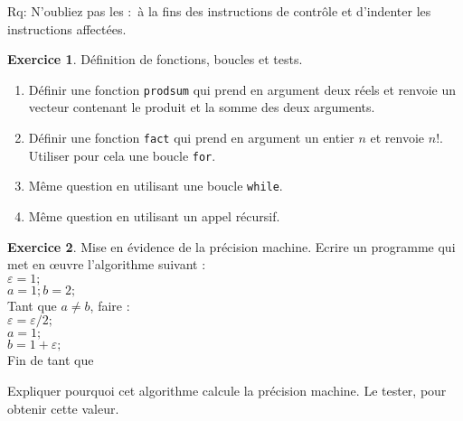 \documentclass[a4paper,francais,11pt]{article}
\theoremstyle{definition}
\newtheorem{exercice}{Exercice}
\begin{document}
Rq: N'oubliez pas les $:$ à la fins des instructions de contrôle et d'indenter les instructions affectées.
\begin{exercice}
  Définition de fonctions, boucles et tests. 
  \begin{enumerate}
  \item Définir une fonction {\tt prodsum} qui prend en argument deux
    réels et renvoie un vecteur contenant le produit et la somme des
    deux arguments.
  \item Définir une fonction {\tt fact} qui prend en
    argument un entier $n$ et renvoie $n!$. Utiliser pour cela une boucle
    {\tt for}.
  \item M\^eme question en utilisant une boucle {\tt while}.
  \item M\^eme question en utilisant un appel récursif.
  \end{enumerate}
\end{exercice}

\begin{exercice}
  Mise en évidence de la précision machine. Ecrire un programme qui met
  en \oe uvre l'algorithme suivant :\\
$\varepsilon = 1;$\\
$a=1;b=2;$\\
Tant que $a\neq b$, faire :\\
\indent $\varepsilon = \varepsilon/2;$\\
\indent $a=1;$\\
\indent $b=1+\varepsilon;$\\
Fin de tant que

Expliquer pourquoi cet algorithme calcule la précision machine. Le
tester, pour obtenir cette valeur.
\end{exercice}
\end{document}
